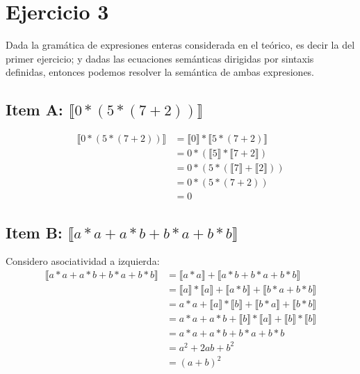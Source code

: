 \documentclass{article}
\newcommand{\sem}[1]{\llbracket #1\rrbracket}
\begin{document}
\section*{Ejercicio 3}
Dada la gramática de expresiones enteras considerada en el teórico, es decir la del primer ejercicio; y dadas las ecuaciones semánticas dirigidas por sintaxis definidas, entonces podemos resolver la semántica de ambas expresiones.

\subsection*{Item A: $\sem{0*(5*(7+2))}$}
\begin{equation*}
	\begin{aligned}
		\sem{0*(5*(7+2))} & = \sem{0} * \sem{5*(7+2)}       \\
		                  & = 0 * (\sem{5} * \sem{7+2})     \\
		                  & = 0 * (5 * (\sem{7} + \sem{2})) \\
		                  & = 0 * (5 * (7 + 2))             \\
		                  & = 0
	\end{aligned}
\end{equation*}

\subsection*{Item B: $\sem{a*a+a*b+b*a+b*b}$}
Considero asociatividad a izquierda:
\begin{equation*}
	\begin{aligned}
		\sem{a*a+a*b+b*a+b*b} & = \sem{a*a} + \sem{a*b+b*a+b*b}                 \\
		                      & = \sem{a}*\sem{a} + \sem{a*b} + \sem{b*a+b*b}   \\
		                      & = a*a + \sem{a}*\sem{b} + \sem{b*a} + \sem{b*b} \\
		                      & = a*a + a*b + \sem{b}*\sem{a} + \sem{b}*\sem{b} \\
		                      & = a*a + a*b + b*a + b*b                         \\
		                      & = a^2 + 2ab + b^2                               \\
		                      & = (a + b)^2
	\end{aligned}
\end{equation*}
\end{document}
